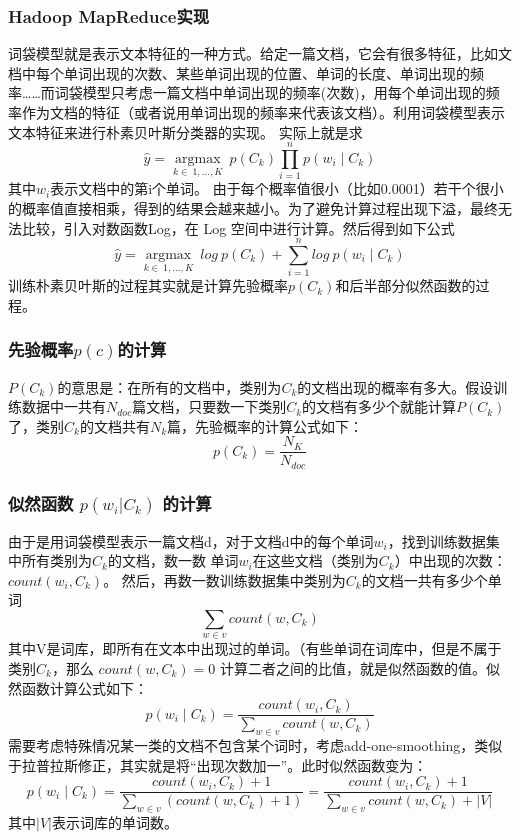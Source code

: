 \documentclass[lang=cn,11pt]{elegantpaper}
\begin{document}
\subsubsection{Hadoop MapReduce实现}
词袋模型就是表示文本特征的一种方式。给定一篇文档，它会有很多特征，比如文档中每个单词出现的次数、某些单词出现的位置、单词的长度、单词出现的频率……而词袋模型只考虑一篇文档中单词出现的频率(次数)，用每个单词出现的频率作为文档的特征（或者说用单词出现的频率来代表该文档）。利用词袋模型表示文本特征来进行朴素贝叶斯分类器的实现。
实际上就是求
$$\hat{y} = {\underset {k \in \ {1,\dots,K}} {\operatorname {argmax}}} \ p(C_ {k})\prod_{i = 1} ^ {n} p(w_ {i} \mid C_ {k})$$
其中$w_i$表示文档中的第i个单词。
由于每个概率值很小（比如0.0001）若干个很小的概率值直接相乘，得到的结果会越来越小。为了避免计算过程出现下溢，最终无法比较，引入对数函数Log，在 Log 空间中进行计算。然后得到如下公式
$$\hat{y} = {\underset {k \in \ {1,\dots,K}} {\operatorname {argmax}}} \ log \ p(C_ {k}) + \sum_{i = 1} ^ {n} log \ p(w_ {i} \mid C_ {k})$$
训练朴素贝叶斯的过程其实就是计算先验概率$p(C_k)​$和后半部分似然函数的过程。

\subsubsection{先验概率$p(c)$的计算}
$P(C_k)$的意思是：在所有的文档中，类别为$C_{k}$的文档出现的概率有多大。假设训练数据中一共有$N_{doc}$篇文档，只要数一下类别$C_{k}$的文档有多少个就能计算$P(C_k)$了，类别$C_{k}$的文档共有$N_k$篇，先验概率的计算公式如下：
$$p(C_k)=\frac{N_K}{N_{doc}}$$

\subsubsection{似然函数 $p(w_i|C_k)$ 的计算}
由于是用词袋模型表示一篇文档d，对于文档d中的每个单词$w_i$，找到训练数据集中所有类别为$C_{k}$的文档，数一数 单词$w_i$在这些文档（类别为$C_{k}$）中出现的次数：$count(w_{i},C_{k})$。
然后，再数一数训练数据集中类别为$C_{k}​$的文档一共有多少个单词
$$\sum_{w \in v}count(w, C_{k})$$
其中V是词库，即所有在文本中出现过的单词。（有些单词在词库中，但是不属于类别$C_{k}$，那么 $count(w, C_{k}) = 0​$
计算二者之间的比值，就是似然函数的值。似然函数计算公式如下：
$$p(w_ {i} \mid C_ {k})=\frac{count(w_i, C_k)}{\sum_{w \in v}count(w, C_{k})}$$
需要考虑特殊情况某一类的文档不包含某个词时，考虑add-one-smoothing，类似于拉普拉斯修正，其实就是将“出现次数加一”。此时似然函数变为：
$$p(w_ {i} \mid C_ {k})=\frac{count(w_i, C_k)+1}{\sum_{w \in v}(count(w, C_{k})+1)}=\frac{count(w_i, C_k)+1}{\sum_{w \in v}count(w, C_{k})+|V|}$$
其中$|V|$表示词库的单词数。
\end{document}
